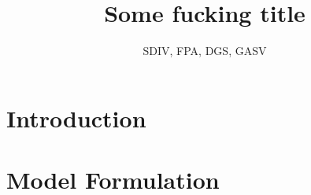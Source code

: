 \documentclass[a4paper,10pt]{amsart}
\begin{document}
    \author{SDIV, FPA, DGS, GASV}
    \title{Some fucking title}
    \maketitle

    \begin{abstract}
    
    \end{abstract}

    \section{Introduction}
    \section{Model Formulation}
\end{document}
